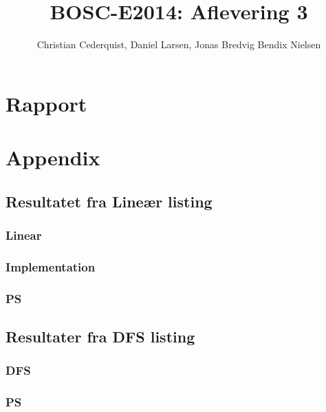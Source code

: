 \documentclass[oneside]{report}
\title{BOSC-E2014: Aflevering 3}
\author{Christian Cederquist, Daniel Larsen, Jonas Bredvig Bendix Nielsen }
\begin{document}
\maketitle
\tableofcontents

\part{Rapport}








\part{Appendix}
\appendix
\chapter{Resultatet fra Lineær listing}
\label{ResultaterLinear}
\section{Linear}
\section{Implementation}


\section{PS}

\chapter{Resultater fra DFS listing}
\label{ResultaterDFS}
\section{DFS}


\section{PS}



\end{document}
